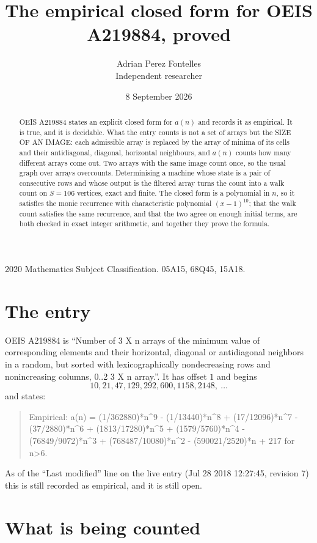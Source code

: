 \documentclass[11pt,a4paper]{article}
\title{The empirical closed form for OEIS A219884, proved}
\author{Adrian Perez Fontelles\\ \small Independent researcher}
\date{8 September 2026}
\theoremstyle{plain}
\theoremstyle{definition}
\begin{document}
\maketitle

\begin{abstract}
OEIS A219884 states an explicit closed form for $a(n)$ and records it as empirical. It is true, and
it is decidable. What the entry counts is not a set of arrays but the SIZE OF AN IMAGE: each
admissible array is replaced by the array of minima of its cells and their antidiagonal, diagonal, horizontal neighbours,
and $a(n)$ counts how many different arrays come out. Two arrays with the same image count
once, so the usual graph over arrays overcounts. Determinising a machine whose state is a pair
of consecutive rows and whose output is the filtered array turns the count into a walk count on
$S=106$ vertices, exact and finite. The closed form is a polynomial in $n$, so it satisfies the
monic recurrence with characteristic polynomial $(x-1)^{10}$; that the walk count
satisfies the same recurrence, and that the two agree on enough initial terms, are both checked
in exact integer arithmetic, and together they prove the formula.
\end{abstract}

\noindent\small 2020 Mathematics Subject Classification. 05A15, 68Q45, 15A18.\normalsize

\section{The entry}

OEIS A219884 is ``Number of 3 X n arrays of the minimum value of corresponding elements and their horizontal, diagonal or antidiagonal neighbors in a random, but sorted with lexicographically nondecreasing rows and nonincreasing columns, 0..2 3 X n array.''. It has offset $1$ and begins
\[
10, 21, 47, 129, 292, 600, 1158, 2148,\ \dots
\]
and states:
\begin{quote}
Empirical: a(n) = (1/362880)*n\^{}9 - (1/13440)*n\^{}8 + (17/12096)*n\^{}7 - (37/2880)*n\^{}6 + (1813/17280)*n\^{}5 + (1579/5760)*n\^{}4 - (76849/9072)*n\^{}3 + (768487/10080)*n\^{}2 - (590021/2520)*n + 217 for n>6.
\end{quote}
As of the ``Last modified'' line on the live entry (Jul 28 2018 12:27:45, revision 7)
this is still recorded as empirical, and it is still open.

\section{What is being counted}
\end{document}
